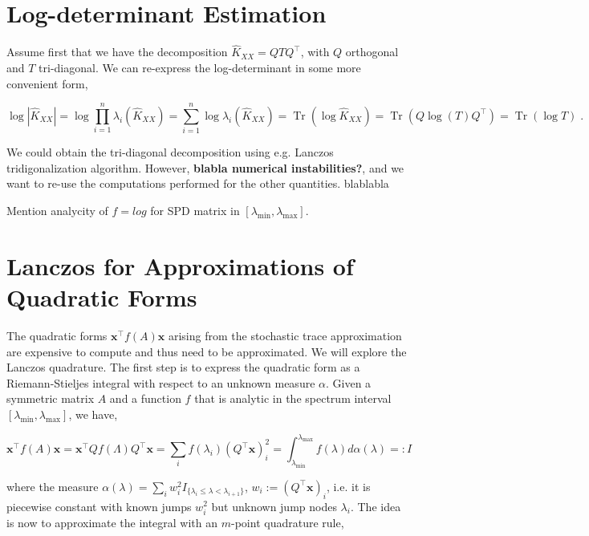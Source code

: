 \documentclass{article}
\newcommand{\vect}[1]{\boldsymbol{\mathbf{#1}}}
\DeclareMathOperator{\trace}{Tr}
\begin{document}
\section{Log-determinant Estimation}

Assume first that we have the decomposition $\widehat K_{XX} = Q T Q^\top$, with $Q$ orthogonal and $T$ tri-diagonal. We can re-express the log-determinant in some more convenient form,

\begin{equation*}
    \log \left | \widehat K_{XX} \right | = \log \prod_{i=1}^n \lambda_i(\widehat K_{XX}) = \sum_{i=1}^n \log \lambda_i(\widehat K_{XX}) = \trace( \log \widehat K_{XX} ) = \trace(Q \log(T) Q^\top ) = \trace (\log T) \; .
\end{equation*}

We could obtain the tri-diagonal decomposition using e.g. Lanczos tridigonalization algorithm. However, \textbf{blabla numerical instabilities?}, and we want to re-use the computations performed for the other quantities. blablabla

Mention analycity of $f=log$ for SPD matrix in $[\lambda_{\min}, \lambda_{\max}]$.


\section{Lanczos for Approximations of Quadratic Forms}


The quadratic forms $\vect x^\top f(A) \vect x$ arising from the stochastic trace approximation are expensive to compute and thus need to be approximated. We will explore the Lanczos quadrature. The first step is to express the quadratic form as a Riemann-Stieljes integral with respect to an unknown measure $\alpha$. Given a symmetric matrix $A$ and a function $f$ that is analytic in the spectrum interval $[\lambda_{\min}, \lambda_{\max}]$, we have,

\begin{equation*}
    \vect x^\top f(A) \vect x = \vect x^\top Q f(\Lambda) Q^\top \vect x = \sum_i f(\lambda_i) (Q^\top \vect x)_i^2 = \int_{\lambda_{\min}}^{\lambda_{\max}} f(\lambda) d \alpha(\lambda) =: I
\end{equation*}

where the measure $\alpha(\lambda) = \sum_i w_i^2 I_{\{\lambda_i \le \lambda < \lambda_{i+1}\}}$, $w_i := (Q^\top \vect x)_i$, i.e. it is piecewise constant with known jumps $w_i^2$ but unknown jump nodes $\lambda_i$. The idea is now to approximate the integral with an $m$-point quadrature rule,
\end{document}
